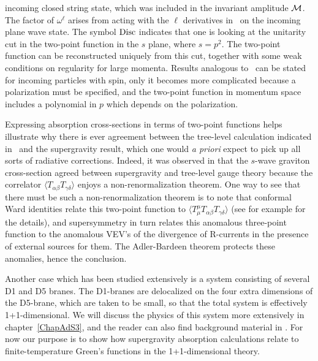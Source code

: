 incoming closed string state, which was included in the invariant amplitude
${\cal M}$.  The factor of $\omega^\ell$ arises from acting with the $\ell$
derivatives in \SintDef\ on the incoming plane wave state.  The symbol
${\rm Disc}$ indicates that one is looking at the unitarity cut in the
two-point function in the $s$ plane, where $s = p^2$.  The two-point
function can be reconstructed uniquely from this cut, together with some
weak conditions on regularity for large momenta.  Results analogous to
\SigmaPartial\ can be stated for incoming particles with spin, only it
becomes more complicated because a polarization must be specified, and the
two-point function in momentum space includes a polynomial in $p$ which
depends on the polarization.

Expressing absorption cross-sections in terms of two-point functions helps
illustrate why there is ever agreement between the tree-level calculation
indicated in \CrossFeynman\ and the supergravity result, which one would
{\it a priori} expect to pick up all sorts of radiative corrections.
Indeed, it was observed in \cite{Gubser:1997se} that the $s$-wave graviton
cross-section agreed between supergravity and tree-level gauge theory
because the correlator $\langle T_{\alpha\beta} T_{\gamma\delta} \rangle$
enjoys a non-renormalization theorem.  One way to see that there must be
such a non-renormalization theorem is to note that conformal Ward
identities relate this two-point function to $\langle T^\mu_\mu
T_{\alpha\beta} T_{\gamma\delta} \rangle$ (see for example
\cite{Erdmenger:1997yc} for the details), and supersymmetry in turn relates
this anomalous three-point function to the anomalous VEV's of the
divergence of R-currents in the presence of external sources for them.  The
Adler-Bardeen theorem \cite{Adler:1969er} protects these anomalies, hence
the conclusion.

Another case which has been studied extensively is a system consisting of
several D1 and D5 branes.  The D1-branes are delocalized on the four extra
dimensions of the D5-brane, which are taken to be small, so that the total
system is effectively 1+1-dimensional.  We will discuss the physics of this
system more extensively in chapter~\ref{ChapAdS3}, and the reader can also
find background material in \cite{Peet:1997es}.  For now our purpose is to
show how supergravity absorption calculations relate to finite-temperature
Green's functions in the 1+1-dimensional theory.

